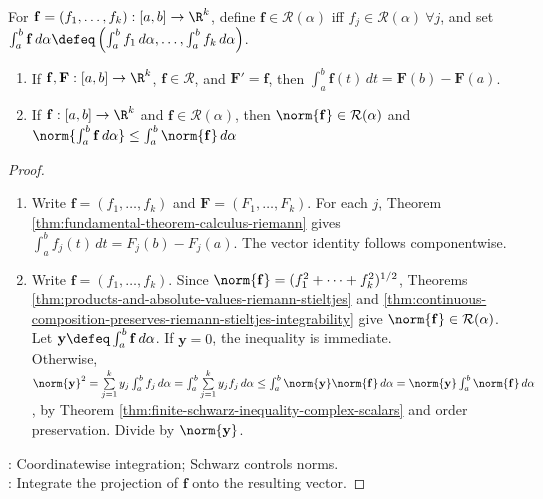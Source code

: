 \begin{definition} \label{def:vector-valued-riemann-stieltjes-integral} \\
For $\mathbf{f}=(f_1,\ldots,f_k):[a,b]\to\R^k$, define $\mathbf{f}\in\mathcal{R}(\alpha)$ iff $f_j\in\mathcal{R}(\alpha) \ \forall j$, and set $\int_a^b \mathbf{f}\,d\alpha \defeq \left(\int_a^b f_1\,d\alpha,\ldots,\int_a^b f_k\,d\alpha\right)$.
\end{definition}

\begin{theorem} \label{thm:vector-valued-integral-results} 
\begin{enumerate}[label=(\roman*)]
\setlength{\itemsep}{0pt}
\item If $\mathbf{f},\mathbf{F}:[a,b]\to\R^k$, $\mathbf{f}\in\mathcal{R}$, and $\mathbf{F}'=\mathbf{f}$, then $\int_a^b \mathbf{f}(t)\,dt=\mathbf{F}(b)-\mathbf{F}(a)$.
\item If $\mathbf{f}:[a,b]\to\R^k$ and $\mathbf{f}\in\mathcal{R}(\alpha)$, then $\norm{\mathbf{f}}\in\mathcal{R}(\alpha)$ and $\norm{\int_a^b \mathbf{f}\,d\alpha}\leq\int_a^b\norm{\mathbf{f}}\,d\alpha$
\end{enumerate}
\begin{proof}
\begin{enumerate}[label=(\roman*)]
\setlength{\itemsep}{0pt}
\item
Write $\mathbf{f}=(f_1,\ldots,f_k)$ and $\mathbf{F}=(F_1,\ldots,F_k)$. For each $j$, Theorem \ref{thm:fundamental-theorem-calculus-riemann} gives $\int_a^b f_j(t)\,dt=F_j(b)-F_j(a)$. The vector identity follows componentwise.
\item
Write $\mathbf{f}=(f_1,\ldots,f_k)$. Since $\norm{\mathbf{f}}=(f_1^2+\cdots+f_k^2)^{1/2}$, Theorems \ref{thm:products-and-absolute-values-riemann-stieltjes} and \ref{thm:continuous-composition-preserves-riemann-stieltjes-integrability} give $\norm{\mathbf{f}}\in\mathcal{R}(\alpha)$.\\
Let $\mathbf{y}\defeq\int_a^b\mathbf{f}\,d\alpha$. If $\mathbf{y}=0$, the inequality is immediate.\\
Otherwise, $\norm{\mathbf{y}}^2 =\sum\limits_{j=1}^{k}y_j\int_a^b f_j\,d\alpha =\int_a^b\sum\limits_{j=1}^{k}y_jf_j\,d\alpha \leq\int_a^b\norm{\mathbf{y}}\norm{\mathbf{f}}\,d\alpha =\norm{\mathbf{y}}\int_a^b\norm{\mathbf{f}}\,d\alpha$, by Theorem \ref{thm:finite-schwarz-inequality-complex-scalars} and order preservation. Divide by $\norm{\mathbf{y}}$.
\end{enumerate}
: Coordinatewise integration; Schwarz controls norms.\\
: Integrate the projection of $\mathbf{f}$ onto the resulting vector.
\end{proof}
\end{theorem}

